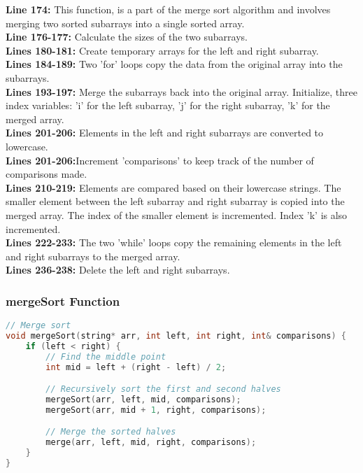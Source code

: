 \documentclass[letterpaper, 10pt,DIV=13]{scrartcl}
\numberwithin{equation}{section} %
\numberwithin{figure}{section} %
\numberwithin{table}{section} %
\begin{document}
\textbf{Line 174:} This function, is a part of the merge sort algorithm and involves merging two sorted subarrays into a single sorted array. \\
\textbf{Line 176-177:} Calculate the sizes of the two subarrays. \\
\textbf{Lines 180-181:} Create temporary arrays for the left and right subarray. \\
\textbf{Lines 184-189:} Two 'for' loops copy the data from the original array into the subarrays.  \\
\textbf{Lines 193-197:} Merge the subarrays back into the original array. Initialize, three index variables: 'i' for the left subarray, 'j' for the right subarray, 'k' for the merged array.  \\
\textbf{Lines 201-206:} Elements in the left and right subarrays are converted to lowercase. \\
\textbf{Lines 201-206:}Increment 'comparisons' to keep track of the number of comparisons made. \\
\textbf{Lines 210-219:} Elements are compared based on their lowercase strings. The smaller element between the left subarray and right subarray is copied into the merged array. The index of the smaller element is incremented. Index 'k' is also incremented. \\
\textbf{Lines 222-233:} The two 'while' loops copy the remaining elements in the left and right subarrays to the merged array. \\
\textbf{Lines 236-238:} Delete the left and right subarrays.

\subsubsection{mergeSort Function}
\begin{linenumbers}
\begin{lstlisting}[language=C++, caption={mergeSort Function}, label={code:example}]
// Merge sort 
void mergeSort(string* arr, int left, int right, int& comparisons) {
    if (left < right) {
        // Find the middle point
        int mid = left + (right - left) / 2;

        // Recursively sort the first and second halves
        mergeSort(arr, left, mid, comparisons);
        mergeSort(arr, mid + 1, right, comparisons);

        // Merge the sorted halves
        merge(arr, left, mid, right, comparisons);
    }
}
\end{lstlisting}
\end{linenumbers}
\nolinenumbers
\end{document}
